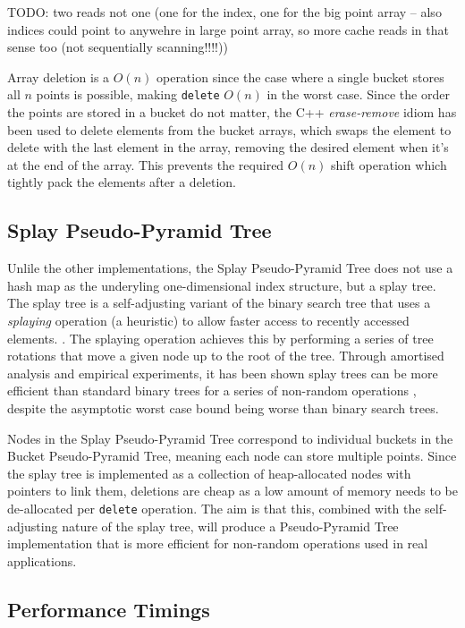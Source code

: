 TODO: two reads not one (one for the index, one for the big point array -- also indices could point to anywehre in large point array, so more cache reads in that sense too (not sequentially scanning!!!!))

Array deletion is a $O(n)$ operation since the case where a single bucket stores all $n$ points is possible, making \texttt{delete} $O(n)$ in the worst case. Since the order the points are stored in a bucket do not matter, the C++ \textit{erase-remove} idiom has been used to delete elements from the bucket arrays, which swaps the element to delete with the last element in the array, removing the desired element when it's at the end of the array. This prevents the required $O(n)$ shift operation which tightly pack the elements after a deletion.

\subsection{Splay Pseudo-Pyramid Tree}

Unlile the other implementations, the Splay Pseudo-Pyramid Tree does not use a hash map as the underyling one-dimensional index structure, but a splay tree. The splay tree is a self-adjusting variant of the binary search tree that uses a \textit{splaying} operation (a heuristic) to allow faster access to recently accessed elements. \cite{splay-tree}. The splaying operation achieves this by performing a series of tree rotations that move a given node up to the root of the tree. Through amortised analysis and empirical experiments, it has been shown splay trees can be more efficient than standard binary trees for a series of non-random operations \cite{splay-tree}, despite the asymptotic worst case bound being worse than binary search trees.

Nodes in the Splay Pseudo-Pyramid Tree correspond to individual buckets in the Bucket Pseudo-Pyramid Tree, meaning each node can store multiple points. Since the splay tree is implemented as a collection of heap-allocated nodes with pointers to link them, deletions are cheap as a low amount of memory needs to be de-allocated per \texttt{delete} operation. The aim is that this, combined with the self-adjusting nature of the splay tree, will produce a Pseudo-Pyramid Tree implementation that is more efficient for non-random operations used in real applications.

\subsection{Performance Timings}

